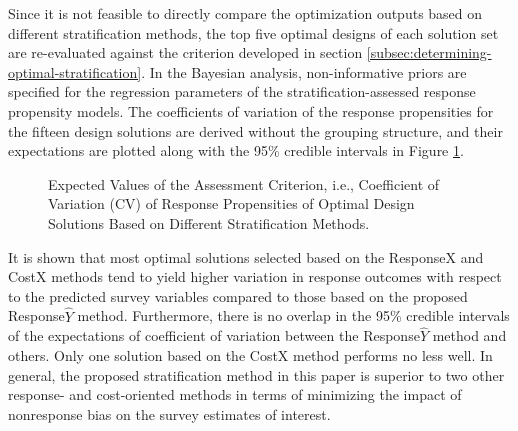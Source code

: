 \documentclass[12pt]{article}
\makeatletter
\def\fixFloatSize#1{}%
\makeatother
\begin{document}
Since it is not feasible to directly compare the optimization outputs based on different stratification methods, the top five optimal designs of each solution set are re-evaluated against the criterion developed in section \ref{subsec:determining-optimal-stratification}.
In the Bayesian analysis, non-informative priors are specified for the regression parameters of the stratification-assessed response propensity models.
The coefficients of variation of the response propensities for the fifteen design solutions are derived without the grouping structure, and their expectations are plotted along with the 95\% credible intervals in Figure \ref{fig-optimal-response-propensities}.
\bgroup
\fixFloatSize{images/CVcriterion.png}
\begin{figure}[!htbp]
\centering \makeatletter{}
\makeatother 
\caption{{Expected Values of the Assessment Criterion, i.e., Coefficient of Variation (CV) of Response Propensities of Optimal Design Solutions Based on Different Stratification Methods.}}
\label{fig-optimal-response-propensities}
\end{figure}
\egroup

It is shown that most optimal solutions selected based on the ResponseX and CostX methods tend to yield higher variation in response outcomes with respect to the predicted survey variables compared to those based on the proposed Response$\hat{Y}$ method.
Furthermore, there is no overlap in the 95\% credible intervals of the expectations of coefficient of variation between the Response$\hat{Y}$ method and others.
Only one solution based on the CostX method performs no less well.
In general, the proposed stratification method in this paper is superior to two other response- and cost-oriented methods in terms of minimizing the impact of nonresponse bias on the survey estimates of interest.
\end{document}
